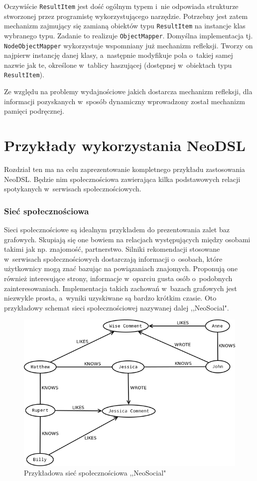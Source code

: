 \documentclass[brudnopis]{xmgr}
\begin{document}
Oczywiście \texttt{ResultItem} jest dość ogólnym typem i~nie odpowiada strukturze stworzonej przez programistę wykorzystującego narzędzie. Potrzebny jest zatem mechanizm zajmujący się zamianą obiektów typu \texttt{ResultItem} na instancje klas wybranego typu. Zadanie to realizuje \texttt{ObjectMapper}. Domyślna implementacja tj. \texttt{NodeObjectMapper} wykorzystuje wspomniany już mechanizm refleksji. Tworzy on najpierw instancję danej klasy, a~następnie modyfikuje pola o~takiej samej nazwie jak te, określone w~tablicy haszującej (dostępnej w~obiektach typu \texttt{ResultItem}).

Ze względu na problemy wydajnościowe jakich dostarcza mechanizm refleksji, dla informacji pozyskanych w~sposób dynamiczny wprowadzony został mechanizm pamięci podręcznej.

\chapter{Przykłady wykorzystania NeoDSL}

Rozdział ten ma na celu zaprezentowanie kompletnego przykładu zastosowania NeoDSL. Będzie nim społecznościowa zawierająca kilka podstawowych relacji spotykanych w~serwisach społecznościowych.

\subsection{Sieć społecznościowa}

Sieci społecznościowe są idealnym przykładem do prezentowania zalet baz grafowych. Skupiają się one bowiem na relacjach występujących między osobami takimi jak np. znajomość, partnerstwo. Silniki rekomendacji stosowane w~serwisach społecznościowych dostarczają informacji o~osobach, które użytkownicy mogą znać bazując na powiązaniach znajomych. Proponują one również interesujące strony, informacje w~oparciu gusta osób o~podobnych zainteresowaniach. Implementacja takich zachowań w~bazach grafowych jest niezwykle prosta, a~wyniki uzyskiwane są bardzo krótkim czasie. Oto przykładowy schemat sieci społecznościowej nazywanej dalej ,,NeoSocial".

\begin{figure}[H]
	\includegraphics[scale=0.5]{images/socialnetwork-data.png}
	\caption{Przykładowa sieć społecznościowa ,,NeoSocial"}
	\label{fig:neosocial_data}
\end{figure}
\end{document}
